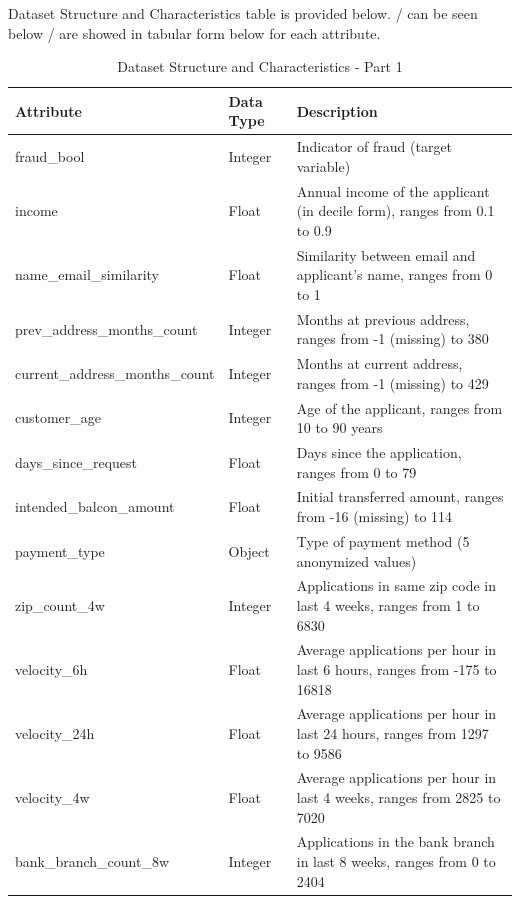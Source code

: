 \documentclass[12pt,a4paper]{report}
\begin{document}
Dataset Structure and Characteristics table is provided below. / can be seen below / are showed in tabular form below for each attribute.

\begin{table}[htbp]
    \centering
    \caption{Dataset Structure and Characteristics - Part 1}
    \begin{tabular}{|p{6cm}|p{3cm}|p{7cm}|}
        \hline
        \textbf{Attribute} & \textbf{Data Type} & \textbf{Description} \\ \hline
        fraud\_bool & Integer & Indicator of fraud (target variable) \\ \hline
        income & Float & Annual income of the applicant (in decile form), ranges from 0.1 to 0.9 \\ \hline
        name\_email\_similarity & Float & Similarity between email and applicant’s name, ranges from 0 to 1 \\ \hline
        prev\_address\_months\_count & Integer & Months at previous address, ranges from -1 (missing) to 380 \\ \hline
        current\_address\_months\_count & Integer & Months at current address, ranges from -1 (missing) to 429 \\ \hline
        customer\_age & Integer & Age of the applicant, ranges from 10 to 90 years \\ \hline
        days\_since\_request & Float & Days since the application, ranges from 0 to 79 \\ \hline
        intended\_balcon\_amount & Float & Initial transferred amount, ranges from -16 (missing) to 114 \\ \hline
        payment\_type & Object & Type of payment method (5 anonymized values) \\ \hline
        zip\_count\_4w & Integer & Applications in same zip code in last 4 weeks, ranges from 1 to 6830 \\ \hline
        velocity\_6h & Float & Average applications per hour in last 6 hours, ranges from -175 to 16818 \\ \hline
        velocity\_24h & Float & Average applications per hour in last 24 hours, ranges from 1297 to 9586 \\ \hline
        velocity\_4w & Float & Average applications per hour in last 4 weeks, ranges from 2825 to 7020 \\ \hline
        bank\_branch\_count\_8w & Integer & Applications in the bank branch in last 8 weeks, ranges from 0 to 2404 \\ \hline
    \end{tabular}
    \label{tab:data-understanding-part1}
\end{table}
\end{document}
